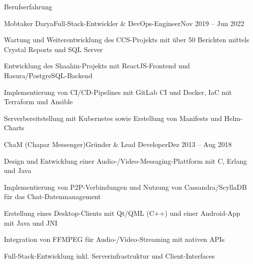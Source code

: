 \documentclass[]{main}
\begin{document}
\begin{section}{Berufserfahrung}
 \begin{subsection}{Mobtaker Darya}{Full-Stack-Entwickler \& DevOps-Engineer}{Nov 2019 -- Jun 2022}{}
     \item Wartung und Weiterentwicklung des CCS-Projekts mit über 50 Berichten mittels Crystal Reports und SQL Server
     \item Entwicklung des Shaahin-Projekts mit ReactJS-Frontend und Hasura/PostgreSQL-Backend
     \item Implementierung von CI/CD-Pipelines mit GitLab CI und Docker, IaC mit Terraform und Ansible
     \item Serverbereitstellung mit Kubernetes sowie Erstellung von Manifests und Helm-Charts
 \end{subsection}

 \begin{subsection}{ChaM (Chapar Messenger)}{Gründer \& Lead Developer}{Dez 2013 -- Aug 2018}{}
     \item Design und Entwicklung einer Audio-/Video-Messaging-Plattform mit C, Erlang und Java
     \item Implementierung von P2P-Verbindungen und Nutzung von Cassandra/ScyllaDB für das Chat-Datenmanagement
     \item Erstellung eines Desktop-Clients mit Qt/QML (C++) und einer Android-App mit Java und JNI
     \item Integration von FFMPEG für Audio-/Video-Streaming mit nativen APIs
     \item Full-Stack-Entwicklung inkl. Serverinfrastruktur und Client-Interfaces
 \end{subsection}
\end{section}

\end{document}
